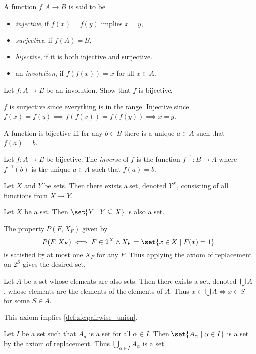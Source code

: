 
\begin{definition}
    A function $f\colon A \to B$ is said to be
    \begin{itemize}
        \item \emph{injective}, if $f(x) = f(y)$ implies $x = y$,
        \item \emph{surjective}, if $f(A) = B$,
        \item \emph{bijective}, if it is both injective and surjective.
        \item an \emph{involution}, if $f(f(x)) = x$ for all $x \in A$.
    \end{itemize}
\end{definition}
\begin{exercise}
    Let $f\colon A \to B$ be an involution.
    Show that $f$ is bijective.
\end{exercise}
\begin{solution}
    $f$ is surjective since everything is in the range.
    Injective since $f(x) = f(y) \implies f(f(x)) = f(f(y)) \implies x = y$.
\end{solution}

A function is bijective iff for any $b \in B$ there is a unique $a \in A$
such that $f(a) = b$.
\begin{definition}
    Let $f\colon A \to B$ be bijective.
    The \emph{inverse} of $f$ is the function $f^{-1}\colon B \to A$
    where $f^{-1}(b)$ is the unique $a \in A$ such that $f(a) = b$.
\end{definition}

\begin{axiom}[Powers] \label{def:zfc:powers}
    Let $X$ and $Y$ be sets.
    Then there exists a set, denoted $Y^X$, consisting of all functions
    from $X \to Y$.
\end{axiom}
\begin{exercise}
    Let $X$ be a set.
    Then $\set{Y \mid Y \subseteq X}$ is also a set.
\end{exercise}
\begin{solution}
    The property $P(F, X_F)$ given by \[
        P(F, X_F) \iff F \in 2^X \land X_F = \set{x \in X \mid F(x) = 1}
    \] is satisfied by at most one $X_F$ for any $F$.
    Thus applying the axiom of replacement on $2^S$ gives the desired set.
\end{solution}

\begin{axiom}[Unions] \label{def:zfc:unions}
    Let $A$ be a set whose elements are also sets.
    Then there exists a set, denoted $\bigcup A$, whose elements are the
    elements of the elements of $A$.
    Thus $x \in \bigcup A \iff x \in S$ for some $S \in A$.
\end{axiom}
\begin{remark}
    This axiom implies \cref{def:zfc:pairwise_union}.

    Let $I$ be a set such that $A_\alpha$ is a set for all $\alpha \in I$.
    Then $\set{A_\alpha \mid \alpha \in I}$ is a set by the axiom of
    replacement.
    Thus $\bigcup_{\alpha \in I} A_\alpha$ is a set.
\end{remark}

